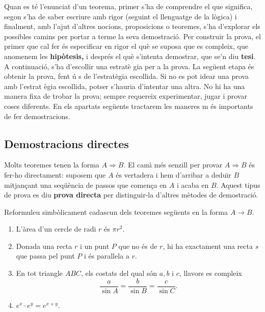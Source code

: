 Quan es t\'{e} l'enunciat d'un teorema, primer s'ha de comprendre el que
significa, segon s'ha de saber escriure amb rigor (seguint el llenguatge de
la l\`{o}gica) i finalment, amb l'ajut d'altres nocions, proposicions o
teoremes, s'ha d'explorar els possibles camins per portar a terme la seva
demostraci\'{o}. Per construir la prova, el primer que cal fer \'{e}s
especificar en rigor el qu\`{e} se suposa que es compleix, que anomenem les
\textbf{hip\`{o}tesis, }i despr\'{e}s el qu\`{e} s'intenta demostrar, que
se'n diu \textbf{tesi}. A continuaci\'{o}, s'ha d'escollir una estrat\`{e}%
gia per a la prova. La seg\"{u}ent etapa \'{e}s obtenir la prova, fent \'{u}%
s de l'estrat\`{e}gia escollida. Si no es pot idear una prova amb l'estrat%
\`{e}gia escollida, potser s'hauria d'intentar una altra. No hi ha una
manera fixa de trobar la prova; sempre requereix experimentar, jugar i
provar coses diferents. En els apartats seg\"{u}ents tractarem les maneres m%
\'{e}s importants de fer demostracions.

\subsection{Demostracions directes}

Molts teoremes tenen la forma $A\Longrightarrow B$. El cam\'{\i} m\'{e}s
senzill per provar $A\Longrightarrow B$ \'{e}s fer-ho directament: suposem
que $A$ \'{e}s vertadera i hem d'arribar a dedu\"{\i}r $B$ mitjan\c{c}ant
una seq\"{u}\`{e}ncia de passos que comen\c{c}a en $A$ i acaba en $B$.
Aquest tipus de prova es diu \textbf{prova directa} per distinguir-la
d'altres m\`{e}todes de demostraci\'{o}.

\begin{exem}
Reformuleu simb\`{o}licament cadascun dels teoremes seg\"{u}ents en la forma
$A\longrightarrow B$.

\begin{enumerate}
\item L'\`{a}rea d'un cercle de radi $r$ \'{e}s $\pi r^{2}$.

\item Donada una recta $r$ i un punt $P$ que no \'{e}s de $r$, hi ha
exactament una recta $s$ que passa pel punt $P$ i \'{e}s
paral\textperiodcentered lela a $r$.

\item En tot triangle $ABC$, els costats del qual s\'{o}n $a,b$ i $c$,
llavors es compleix%
\begin{equation*}
\frac{a}{\sin A}=\frac{b}{\sin B}=\frac{c}{\sin C}\text{.}
\end{equation*}

\item $e^{x}\cdot e^{y}=e^{x+y}$.
\end{enumerate}
\end{exem}

